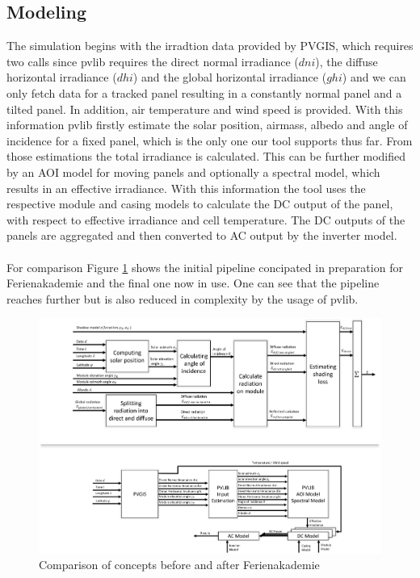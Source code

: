 \documentclass[12pt]{report}
\begin{document}
\subsection*{Modeling}
The simulation begins with the irradtion data provided by PVGIS, which requires two calls since pvlib requires the direct normal irradiance ($dni$), the diffuse horizontal irradiance ($dhi$) 
and the global horizontal irradiance ($ghi$) and we can only fetch data for a tracked panel resulting in a constantly normal panel and a tilted panel. In addition, air temperature and wind speed is provided.
With this information pvlib firstly estimate the solar position, airmass, albedo and angle of incidence for a fixed panel, which is the only one our tool supports thus far. From those estimations the total irradiance
is calculated. This can be further modified by an AOI model for moving panels and optionally a spectral model, which results in an effective irradiance. With this information the tool uses the respective module and
casing models to calculate the DC output of the panel, with respect to effective irradiance and cell temperature. The DC outputs of the panels are aggregated and then converted to AC output by the inverter model.
\\~\\
For comparison Figure \ref{fig:comparison} shows the initial pipeline concipated in preparation for Ferienakademie and the final one now in use. One can see that the pipeline reaches further but is also reduced in complexity
by the usage of pvlib. 
\begin{figure}[H]
    \centering
    \includegraphics[width=1.0\linewidth]{images/comparison.png}
    \caption{Comparison of concepts before and after Ferienakademie}
    \label{fig:comparison}
\end{figure}
\end{document}
